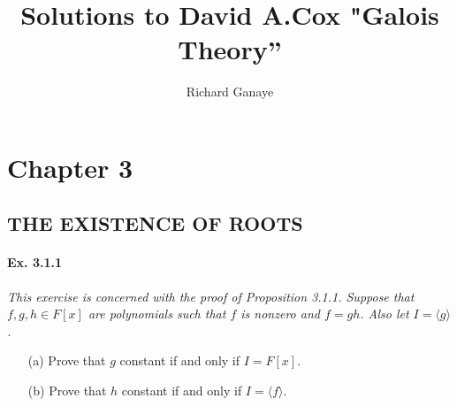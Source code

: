 \documentclass[11pt,a4paper]{article}
\title{Solutions to David A.Cox  "Galois Theory''}
\author{Richard Ganaye}
\begin{document}
\section{Chapter 3}

\subsection{THE EXISTENCE OF ROOTS}

\paragraph{Ex. 3.1.1}

{\it This exercise is concerned with the proof of Proposition 3.1.1. Suppose that $f,g,h \in F[x]$ are polynomials such that $f$ is nonzero and $f=gh$. Also let $I = \langle g \rangle$.
\begin{enumerate}
\item[(a)] Prove that $g$ constant if and only if $I = F[x]$.
\item[(b)] Prove that $h$ constant if and only if $I = \langle f \rangle$.
\end{enumerate}
}
\end{document}
